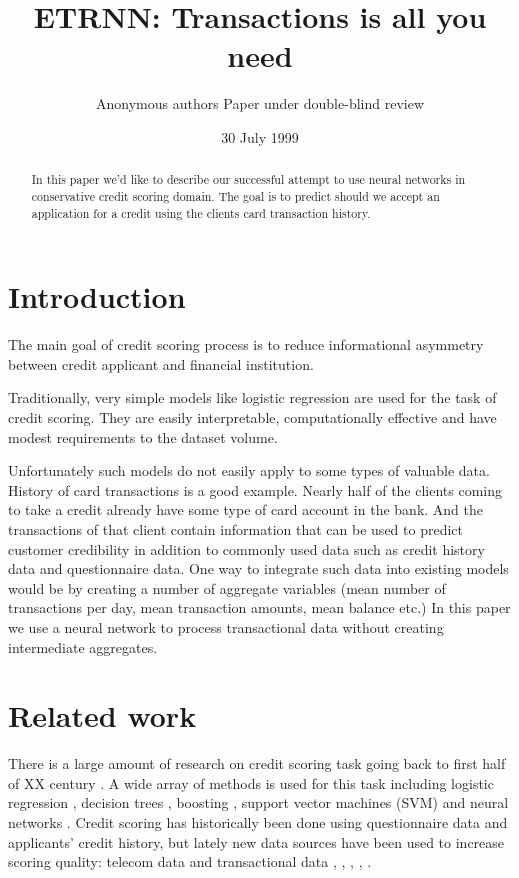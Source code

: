 \documentclass{sigkddExp}
\begin{document}
\title{ETRNN: Transactions is all you need}

\author{
\alignauthor Anonymous authors
Paper under double-blind review
}

\date{30 July 1999}
\maketitle
\begin{abstract}
In this paper we'd like to describe our successful attempt to use neural networks in conservative credit scoring domain.
The goal is to predict should we accept an application for a credit using the clients card transaction history.
\end{abstract}

\section{Introduction}

The main goal of credit scoring process is to reduce informational asymmetry between credit applicant and financial institution.

Traditionally, very simple models like logistic regression are used for the task of credit scoring. They are easily interpretable, computationally effective and have modest requirements to the dataset volume.

Unfortunately such models do not easily apply to some types of valuable data. History of card transactions is a good example. Nearly half of the clients coming to take a credit already have some type of card account in the bank. And the transactions of that client contain information that can be used to predict customer credibility in addition to commonly used data such as credit history data and questionnaire data. One way to integrate such data into existing models would be by creating a number of aggregate variables (mean number of transactions per day, mean transaction amounts, mean balance etc.) In this paper we use a neural network to process transactional data without creating intermediate aggregates.

\section{Related work}

There is a large amount of research on credit scoring task going back to first half of XX century \cite{NBERc12952}. A wide array of methods is used for this task including logistic regression \cite{RePEc:cup:jfinqa:v:15:y:1980:i:03:p:757-770_00}, decision trees \cite{makowski1985credit}, boosting \cite{bastos2007credit}, support vector machines (SVM) \cite{HUANG2007847} and neural networks \cite{west2000neural}. Credit scoring has historically been done using questionnaire data and applicants' credit history, but lately new data sources have been used to increase scoring quality: telecom data \cite{bjorkegren2017behavior} and transactional data \cite{khandani2010consumer}, \cite{bellotti2013forecasting}, \cite{KVAMME2018207}, \cite{chi2012hybrid}, \cite{RePEc}.
\end{document}
